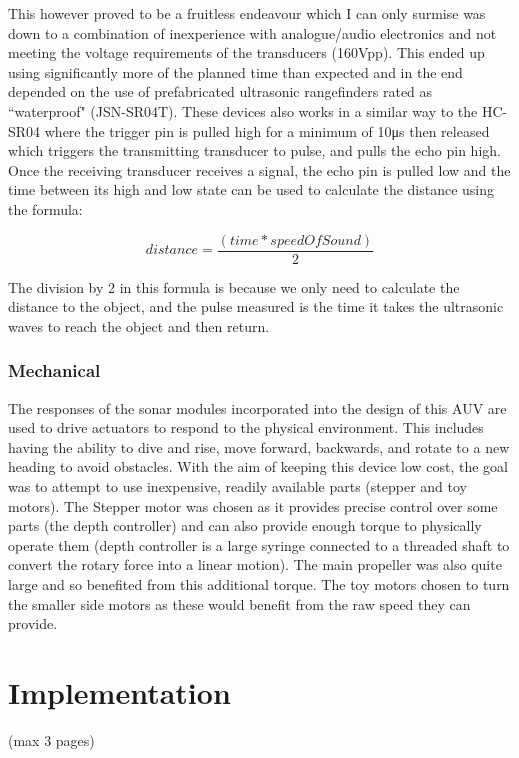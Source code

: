 \documentclass[11pt,a4paper,titlepage]{report}
\begin{document}
	This however proved to be a fruitless endeavour which I can only surmise was down to a combination of inexperience with analogue/audio electronics and not meeting the voltage requirements of the transducers (160\unit{\volt}pp). This ended up using significantly more of the planned time than expected and in the end depended on the use of prefabricated ultrasonic rangefinders rated as ``waterproof" (JSN-SR04T\cite{JSN_SR04T}). These devices also works in a similar way to the HC-SR04\cite{HC_SR04} where the trigger pin is pulled high for a minimum of 10\unit{\micro\second} then released which triggers the transmitting transducer to pulse, and pulls the echo pin high. Once the receiving transducer receives a signal, the echo pin is pulled low and the time between its high and low state can be used to calculate the distance using the formula:
	
	$$
	distance = \frac{(time * speedOfSound)}{2}
	$$	
	
	The division by 2 in this formula is because we only need to calculate the distance to the object, and the pulse measured is the time it takes the ultrasonic waves to reach the object and then return.
	
	\subsection*{Mechanical}
	The responses of the sonar modules incorporated into the design of this AUV are used to drive actuators to respond to the physical environment. This includes having the ability to dive and rise, move forward, backwards, and rotate to a new heading to avoid obstacles. With the aim of keeping this device low cost, the goal was to attempt to use inexpensive, readily available parts (stepper and toy motors). The Stepper motor was chosen as it provides precise control over some parts (the depth controller) and can also provide enough torque to physically operate them (depth controller is a large syringe connected to a threaded shaft to convert the rotary force into a linear motion). The main propeller was also quite large and so benefited from this additional torque. The toy motors chosen to turn the smaller side motors as these would benefit from the raw speed they can provide. 
	
	\chapter*{Implementation}
	(max 3 pages)
	
\end{document}
